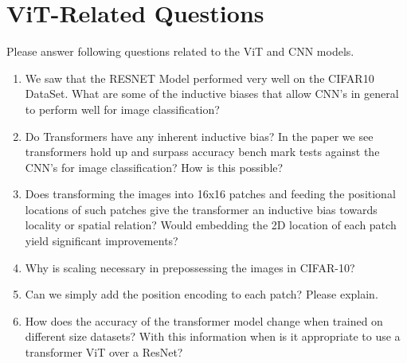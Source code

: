 \documentclass{article}
\begin{document}
\section{ViT-Related Questions}
\bigbreak
Please answer following questions related to the ViT and CNN models.
\begin{enumerate}[label=(\alph*)]
\color{black}
\item We saw that the RESNET Model performed very well on the CIFAR10 DataSet. What are some of the inductive biases that allow CNN's in general to perform well for image classification?\par
\medbreak

\color{black}
\item Do Transformers have any inherent inductive bias? In the paper we see transformers hold up and surpass accuracy bench mark tests against the CNN's for image classification? How is this possible?\par
\medbreak

\color{black}
\item Does transforming the images into 16x16 patches and feeding the positional locations of such patches give the transformer an inductive bias towards locality or spatial relation? Would embedding the 2D location of each patch yield significant improvements?\par
\medbreak

\color{black}
\item Why is scaling necessary in prepossessing the images in CIFAR-10?\par
\medbreak

\color{black}
\item Can we simply add the position encoding to each patch? Please explain.\par
\medbreak

\color{black}
\item How does the accuracy of the transformer model change when trained on different size datasets? With this information when is it appropriate to use a transformer ViT over a ResNet?\par
\medbreak

\end{enumerate}

\bigbreak
\end{document}
